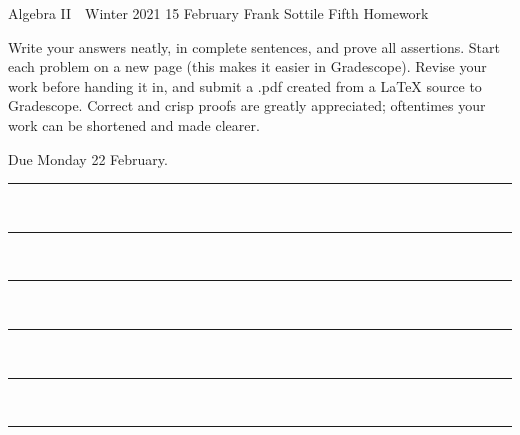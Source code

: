 \documentclass[12pt]{article}
\newcommand{\barsl}{\noindent\begin{minipage}[t]{575pt}
{\color{violet}\rule{575pt}{1.2pt}}\vspace{-5.7mm}\\
{\color{blue}\rule{575pt}{1.2pt}}\vspace{-5.7mm}\\
{\color{green}\rule{575pt}{1.2pt}}\vspace{-5.7mm}\\
{\color{yellow}\rule{575pt}{1.2pt}}\vspace{-5.7mm}\\
{\color{orange}\rule{575pt}{1.2pt}}\vspace{-5.7mm}\\
{\color{red}\rule{575pt}{1.2pt}}
\end{minipage}}
\begin{document}
\LARGE 
\noindent
Algebra II\ \ Winter 2021 \hfill 15 February\makebox[40pt][l]{\ }\newline
Frank Sottile \hfill
\Large\sf
Fifth Homework\makebox[40pt][l]{\ }
\vspace{5pt}
\normalsize

\noindent
Write your answers neatly, in complete sentences, and prove all assertions.
Start each problem on a new page (this makes it easier in Gradescope).
Revise your work before handing it in, and submit a .pdf  created from a LaTeX source to Gradescope.
Correct and crisp proofs are greatly appreciated; oftentimes your work can be shortened and made clearer.

\noindent
{\color{red}Due Monday 22 February.}\vspace{1pt}

\barsl
\end{document}
